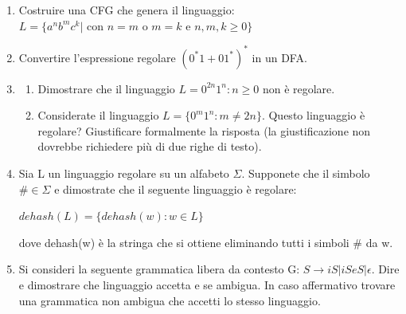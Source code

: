 \documentclass[a4paper,11pt]{article}
\begin{document}
\begin{enumerate}
    \item Costruire una CFG che genera il linguaggio:\\$L=\{a^nb^mc^k |$ con $n=m $ o $ m=k $ e $ n,m,k\geq0\}$
    \item Convertire l’espressione regolare $(0^*1 + 01^*)^*$ in un DFA.
    \item \begin{enumerate}
    \item Dimostrare che il linguaggio $L = 0^{2n}1^n : n \geq 0$ non è regolare.
    \item Considerate il linguaggio $L = \{0^m1^n : m \neq 2n\}$. Questo linguaggio è regolare? Giustificare formalmente la risposta (la giustificazione non dovrebbe richiedere più di due righe di testo).
    \end{enumerate}
    \item Sia L un linguaggio regolare su un alfabeto $\Sigma$. Supponete che il simbolo $\# \in \Sigma$ e dimostrate che il seguente linguaggio è regolare:
\\\begin{center}$dehash(L) = \{dehash(w) : w \in L\}$\end{center}
    dove dehash(w) è la stringa che si ottiene eliminando tutti i simboli $\#$ da w.
    \item Si consideri la seguente grammatica libera da contesto G: $S \rightarrow iS | iSeS | \epsilon$. Dire e dimostrare che linguaggio accetta e se ambigua. In caso affermativo trovare una grammatica non ambigua che accetti lo stesso linguaggio.
\end{enumerate}
\end{document}
